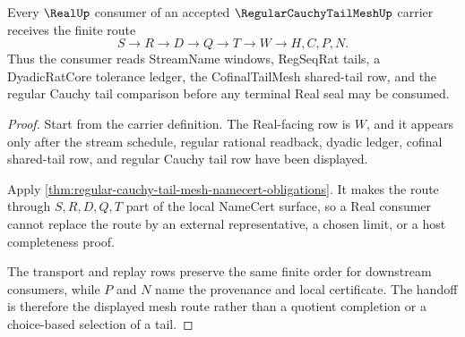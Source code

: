 \begin{theorem}
\label{thm:regular-cauchy-tail-mesh-real-handoff}
Every $\RealUp$ consumer of an accepted $\RegularCauchyTailMeshUp$ carrier receives the finite route
$$
S \longrightarrow R \longrightarrow D \longrightarrow Q \longrightarrow T \longrightarrow W \longrightarrow H,C,P,N .
$$
Thus the consumer reads StreamName windows, RegSeqRat tails, a DyadicRatCore tolerance ledger, the CofinalTailMesh shared-tail row, and the regular Cauchy tail comparison before any terminal Real seal may be consumed.
\end{theorem}
\begin{proof}
Start from the carrier definition. The Real-facing row is $W$, and it appears only after the stream schedule, regular rational readback, dyadic ledger, cofinal shared-tail row, and regular Cauchy tail row have been displayed.

Apply \autoref{thm:regular-cauchy-tail-mesh-namecert-obligations}. It makes the route through $S,R,D,Q,T$ part of the local NameCert surface, so a Real consumer cannot replace the route by an external representative, a chosen limit, or a host completeness proof.

The transport and replay rows preserve the same finite order for downstream consumers, while $P$ and $N$ name the provenance and local certificate. The handoff is therefore the displayed mesh route rather than a quotient completion or a choice-based selection of a tail.
\end{proof}




